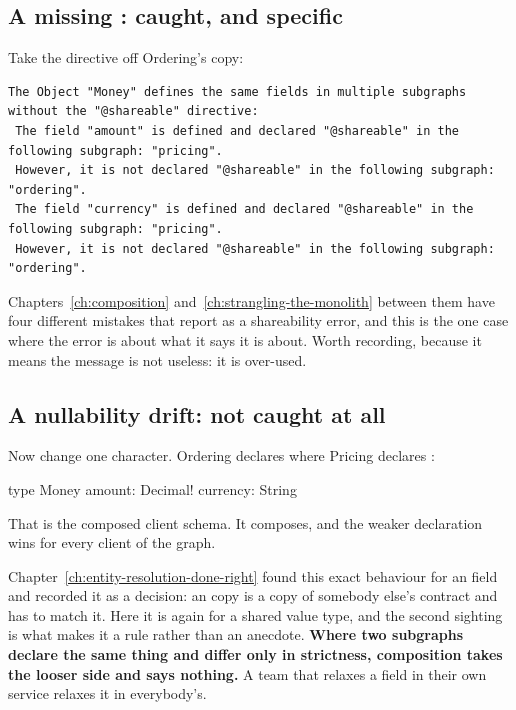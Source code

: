 \subsection*{A missing : caught, and specific}

Take the directive off Ordering's copy:

\begin{verbatim}
The Object "Money" defines the same fields in multiple subgraphs without the "@shareable" directive:
 The field "amount" is defined and declared "@shareable" in the following subgraph: "pricing".
 However, it is not declared "@shareable" in the following subgraph: "ordering".
 The field "currency" is defined and declared "@shareable" in the following subgraph: "pricing".
 However, it is not declared "@shareable" in the following subgraph: "ordering".
\end{verbatim}

Chapters~\ref{ch:composition} and~\ref{ch:strangling-the-monolith} between them
have four different mistakes that report as a shareability error, and this is the
one case where the error is about what it says it is about. Worth recording,
because it means the message is not useless: it is over-used.

\subsection*{A nullability drift: not caught at all}

Now change one character. Ordering declares  where Pricing
declares :

\begin{graphqlsdl}[fontsize=\footnotesize]
type Money { amount: Decimal!  currency: String }
\end{graphqlsdl}

That is the composed client schema. It composes, and the weaker declaration wins
for every client of the graph.

%
Chapter~\ref{ch:entity-resolution-done-right} found this exact behaviour for an
 field and recorded it as a decision: an  copy is
a copy of somebody else's contract and has to match it. Here it is again for a
shared value type, and the second sighting is what makes it a rule rather than an
anecdote. \textbf{Where two subgraphs declare the same thing and differ only in
strictness, composition takes the looser side and says nothing.} A team that
relaxes a field in their own service relaxes it in everybody's.

